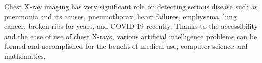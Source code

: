 \begin{figure}[h]
	\centering
	\label{chest_projections}
\end{figure}

Chest X-ray imaging has very significant role on detecting serious disease such as pneumonia and its causes, pneumothorax, heart failures, emphysema, lung cancer, broken ribs for years, and COVID-19 recently. Thanks to the accessibility and the ease of use of chest X-rays, various artificial intelligence problems can be formed and accomplished for the benefit of medical use, computer science and mathematics.
